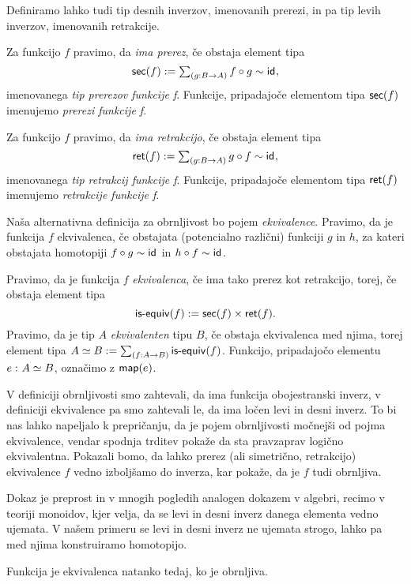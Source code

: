 Definiramo lahko tudi tip desnih inverzov, imenovanih prerezi, in pa tip levih inverzov, imenovanih retrakcije.
\begin{definicija}
  Za funkcijo \(f\) pravimo, da \emph{ima prerez}, če obstaja element tipa
  \[\textnormal{\textsf{sec}}(f) := \textstyle \sum_{\left( g : B \to A \right)} f \circ g \sim \textnormal{\textsf{id}}_{},\]
  imenovanega \emph{tip prerezov funkcije f}.
  Funkcije, pripadajoče elementom tipa \(\textnormal{\textsf{sec}}(f)\) imenujemo \emph{prerezi funkcije f}.

  Za funkcijo \(f\) pravimo, da \emph{ima retrakcijo}, če obstaja element tipa
  \[\textnormal{\textsf{ret}}(f) := \textstyle \sum_{\left( g : B \to A \right)} g \circ f \sim \textnormal{\textsf{id}}_{},\]
  imenovanega \emph{tip retrakcij funkcije f}.
  Funkcije, pripadajoče elementom tipa \(\textnormal{\textsf{ret}}(f)\) imenujemo \emph{retrakcije funkcije f}.
\end{definicija}

Naša alternativna definicija za obrnljivost bo pojem \emph{ekvivalence}. Pravimo, da je funkcija \(f\) ekvivalenca, če obstajata (potencialno različni) funkciji \(g\) in \(h\), za kateri obstajata homotopiji \(f \circ g \sim \textnormal{\textsf{id}}_{}\) in \(h \circ f \sim \textnormal{\textsf{id}}_{}\).

\begin{definicija}
  Pravimo, da je funkcija \(f\) \emph{ekvivalenca}, če ima tako prerez kot retrakcijo,
  torej, če obstaja element tipa \[\textnormal{\textsf{is-equiv}}(f) := \textnormal{\textsf{sec}}(f) \times \textnormal{\textsf{ret}}(f).\]
  Pravimo, da je tip \(A\) \emph{ekvivalenten} tipu \(B\), če obstaja ekvivalenca med
  njima, torej element tipa \(A \simeq B := \textstyle \sum_{\left( f : A \to B \right)} \textnormal{\textsf{is-equiv}}(f)\). Funkcijo,
  pripadajočo elementu \(e \,\colon A \simeq B\), označimo z \(\textnormal{\textsf{map}}(e)\).
\end{definicija}

V definiciji obrnljivosti smo zahtevali, da ima funkcija obojestranski inverz, v
definiciji ekvivalence pa smo zahtevali le, da ima ločen levi in desni inverz.
To bi nas lahko
napeljalo k prepričanju, da je pojem obrnljivosti močnejši od pojma ekvivalence, vendar
spodnja trditev pokaže da sta pravzaprav logično ekvivalentna. Pokazali bomo, da lahko
prerez (ali simetrično, retrakcijo) ekvivalence \(f\) vedno izboljšamo do inverza,
kar pokaže, da je \(f\) tudi obrnljiva.

Dokaz je preprost in v mnogih pogledih analogen dokazem v algebri, recimo v teoriji monoidov, kjer velja, da se levi in desni inverz danega elementa vedno ujemata. V našem primeru se levi in desni inverz ne ujemata strogo, lahko pa med njima konstruiramo homotopijo.
\begin{trditev}
  \label{inv-of-equiv}
  Funkcija je ekvivalenca natanko tedaj, ko je obrnljiva.
\end{trditev}

